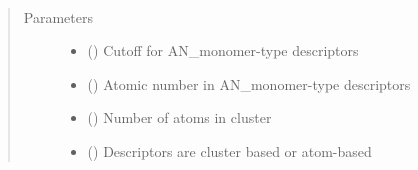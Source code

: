\documentclass[letterpaper,10pt,english]{sphinxmanual}
\begin{document}
\begin{fulllineitems}
\label{\detokenize{descriptors:gap.descriptors.AN_monomer}}~\begin{quote}\begin{description}
\item[{Parameters}] \leavevmode\begin{itemize}
\item {} 
 () \textendash{} Cutoff for AN\_monomer-type descriptors

\item {} 
 () \textendash{} Atomic number in AN\_monomer-type descriptors

\item {} 
 () \textendash{} Number of atoms in cluster

\item {} 
 () \textendash{} Descriptors are cluster based or atom-based

\end{itemize}

\end{description}\end{quote}

\end{fulllineitems}

\end{document}
